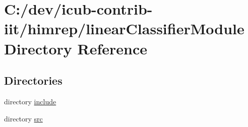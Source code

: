 \section{C\+:/dev/icub-\/contrib-\/iit/himrep/linear\+Classifier\+Module Directory Reference}
\label{dir_eedbbdfc5700622d414b419463b3063b}
\subsection*{Directories}
\begin{DoxyCompactItemize}
\item 
directory \hyperlink{dir_35501fdac143fccee38a09bee6c8d2da}{include}
\item 
directory \hyperlink{dir_0d4ffddeea3200b1e76c3b34c505ad92}{src}
\end{DoxyCompactItemize}
